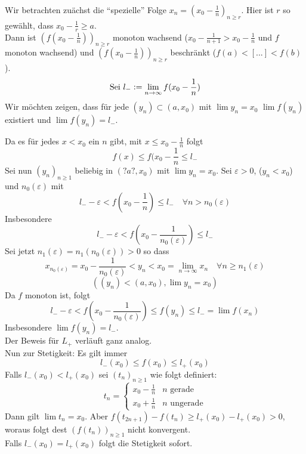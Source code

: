 \noindent Wir betrachten zuächst die ``spezielle'' Folge $x_{n}=(x_{0}-\frac{1}{n})_{n\geq r}$. Hier ist $r$ so gewählt, dass $x_{0}-\frac{1}{r}\geq a$. \\
Dann ist $(f(x_{0}-\frac{1}{n}))_{n\geq r}$ monoton wachsend ($x_{0}-\frac{1}{n+1} > x_{0}-\frac{1}{n}$ und $f$ monoton wachsend) und $(f(x_{0}-\frac{1}{n}))_{n\geq r}$ beschränkt ($f(a)<[...]<f(b)$).
\[\text{Sei }l_{-}\vcentcolon=\lim_{n\to\infty}{f(x_{0}-\frac{1}{n})}\]
\noindent Wir möchten zeigen, dass für jede $(y_{n})\subset (a, x_{0})$ mit $\lim{y_{n}}=x_{0}$ $\lim{f(y_{n})}$ existiert und $\lim{f(y_{n})}=l_{-}$. 

Da es für jedes $x<x_{0}$ ein $n$ gibt, mit $x\leq x_{0}-\frac{1}{n}$ folgt \[f(x) \leq f(x_{0}-\frac{1}{n} \leq l_{-}\]
Sei nun $(y_{n})_{n\geq 1}$ beliebig in $(?a?, x_{0})$ mit $\lim{y_{n}}=x_{0}$. Sei $\varepsilon > 0$, ($y_{n} < x_{0}$) und $n_{0}(\varepsilon)$ mit \[l_{-}-\varepsilon < f(x_{0}-\frac{1}{n})\leq l_{-} \quad \forall n>n_{0}(\varepsilon) \]
Insbesondere
\[l_{-} - \varepsilon < f(x_{0}-\frac{1}{n_{0}(\varepsilon)}) \leq l_{-} \]
Sei jetzt $n_{1}(\varepsilon)=n_{1}(n_{0}(\varepsilon))>0$ so dass \[ x_{n_{0}(\varepsilon)} = x_{0} - \frac{1}{n_{0}(\varepsilon)} < y_{n} < x_{0} = \lim_{n\to\infty}{x_{n}} \quad \forall n \geq n_{1}(\varepsilon)\]
\[ \left((y_{n})<(a,x_{0}), \lim{y_{n}}=x_{0}\right)\]
Da $f$ monoton ist, folgt \[ l_{-} - \varepsilon < f(x_{0}-\frac{1}{n_{0}(\varepsilon)}) \leq f(y_{n}) \leq l_{-} = \lim{f(x_{n})} \]
Insbesondere $\lim{f(y_{n})} = l_{-}$. \\

\noindent Der Beweis für $L_{+}$ verläuft ganz analog. \\

\noindent Nun zur Stetigkeit: Es gilt immer \[ l_{-}(x_{0})\leq f(x_{0}) \leq l_{+}(x_{0}) \]
Falls $l_{-}(x_{0}) < l_{+}(x_{0})$ sei $(t_{n})_{n \geq 1}$ wie folgt definiert:
\[ t_{n}=\begin{cases}x_{0}-\frac{1}{n} &n\text{ gerade} \\ x_{0}+\frac{1}{n} &n\text{ ungerade} \end{cases} \]
Dann gilt $\lim{t_{n}} = x_{0}$. Aber $f(t_{2n+1})-f(t_{n}) \geq l_{+}(x_{0})-l_{+}(x_{0}) >0$, woraus folgt dest  $(f(t_{n}))_{n\geq1}$ nicht konvergent. \\
Falls $l_{-}(x_{0})=l_{+}(x_{0})$ folgt die Stetigkeit sofort. 

